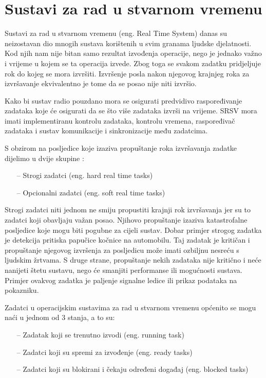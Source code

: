 \documentclass[../zavrsni.tex]{subfiles}
\begin{document}
\section{Sustavi za rad u stvarnom vremenu}

Sustavi za rad u stvarnom vremenu (eng. Real Time System) danas su neizostavan dio mnogih sustava korištenih u svim
granama ljudske djelatnosti. Kod njih nam nije bitan samo rezultat izvođenja operacije, nego je jednako važno 
i vrijeme u kojem se ta operacija izvede. Zbog toga se svakom zadatku pridjeljuje rok do kojeg se mora izvršiti. 
Izvršenje posla nakon njegovog krajnjeg roka za izvršavanje ekvivalentno je tome da se posao nije niti izvršio.

Kako bi sustav radio pouzdano mora se osigurati predvidivo raspoređivanje zadataka koje će osigurati da se što više 
zadataka izvrši na vrijeme.
SRSV mora imati implementiranu kontrolu zadataka, kontrolu vremena, raspoređivač zadataka i sustav komunikacije i sinkronizacije
među zadatcima.

S obzirom na posljedice koje izaziva propuštanje roka izvršavanja zadatke dijelimo u dvije skupine :
\begin{itemize}
    \item[--] Strogi zadatci (eng. hard real time tasks)
    \item[--] Opcionalni zadatci (eng. soft real time tasks)
\end{itemize}
Strogi zadatci niti jednom ne smiju propustiti krajnji rok izvršavanja jer su to zadatci koji obavljaju važan posao. Njihovo 
propuštanje izaziva katastrofalne posljedice koje mogu biti pogubne za cijeli sustav. Dobar primjer strogog zadatka je detekcija 
pritiska papučice kočnice na automobilu. Taj zadatak je kritičan i propuštanje njegovog izvršenja za posljedicu može imati ozbiljnu
nesreću s ljudskim žrtvama. S druge strane, propuštanje nekih zadataka nije kritično i neće nanijeti štetu sustavu, nego će smanjiti
 performanse ili mogućnosti sustava. Primjer ovakvog zadatka je paljenje signalne ledice ili prikaz podataka na pokazniku.

Zadatci u operacijskim sustavima za rad u stvarnom vremenu općenito se mogu naći u jednom od 3 stanja, a to su:
\begin{itemize}
    \item[--] Zadatak koji se trenutno izvodi (eng. running task)
    \item[--] Zadatci koji su spremi za izvođenje (eng. ready tasks)
    \item[--] Zadatci koji su blokirani i čekaju određeni događaj (eng. blocked tasks)
\end{itemize}
\end{document}
